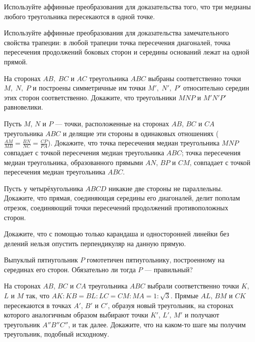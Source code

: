 \documentclass[12pt]{article}
\begin{document}
Используйте аффинные преобразования для доказательства того, что три медианы любого треугольника пересекаются в одной точке.

Используйте аффинные преобразования для доказательства  замечательного свойства трапеции: в любой трапеции точка пересечения диагоналей, точка пересечения продолжений боковых сторон и середины оснований лежат на одной прямой.


На сторонах $AB,\; BC$ и $AC$ треугольника $ABC$ выбраны соответственно точки $M,\; N,\; P$ и построены симметричные им точки $M',\; N',\; P'$ относительно середин этих сторон соответственно. Докажите, что треугольники $MNP$ и $M'N'P'$ равновелики.

Пусть $M$, $N$ и $P$ --- точки, расположенные на сторонах $AB$, $BC$ и $CA$ треугольника $ABC$ и делящие эти стороны в одинаковых отношениях ($\frac{AM}{MB}=\frac{BN}{NC}=\frac{CP}{PA}$). Докажите, что
 точка пересечения медиан треугольника $MNP$ совпадает с точкой пересечения медиан треугольника $ABC$;
 точка пересечения медиан треугольника, образованного прямыми $AN$, $BP$ и $CM$, совпадает с точкой пересечения медиан треугольника $ABC$.

Пусть у четырёхугольника $ABCD$ никакие две стороны не параллельны. Докажите, что прямая, соединяющая середины его диагоналей, делит пополам отрезок, соединяющий точки пересечений продолжений противоположных сторон.

Докажите, что с помощью только карандаша и односторонней линейки без делений нельзя опустить перпендикуляр на данную прямую.

Выпуклый пятиугольник $P$ гомотетичен пятиугольнику, построенному на серединах его сторон. Обязательно ли тогда $P$ --- правильный?

На сторонах $AB$, $BC$ и $CA$ треугольника $ABC$ выбрали соответственно
точки $K$, $L$ и $M$ так, что $AK:KB=BL:LC=CM:MA=1:\sqrt3$.
Прямые $AL$, $BM$ и $CK$ пересекаются в точках $A'$, $B'$ и $C'$,
образуя новый треугольник, на сторонах которого аналогичным образом
выбирают точки $K'$, $L'$, $M'$ и получают треугольник $A''B''C''$,
и так далее. Докажите, что на каком-то шаге мы получим треугольник,
подобный исходному.

\bigskip
{}
\end{document}
